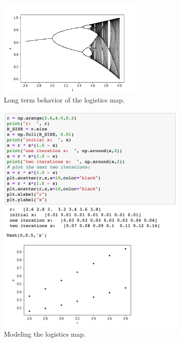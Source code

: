 \begin{figure}[htbp]
\begin{center}
\includegraphics[width=0.65\textwidth]{figs/python/plotting/bifurcation.png} 
\caption{Long term behavior of the logistics map.}
\label{fig:logmap}
\end{center}
\end{figure}

\begin{figure}[htbp]
\begin{center}
\includegraphics[width=0.85\textwidth]{figs/python/plotting/logmapstart.png} 
\caption{Modeling the logistics map.}
\label{fig:logmapstart}
\end{center}
\end{figure}

